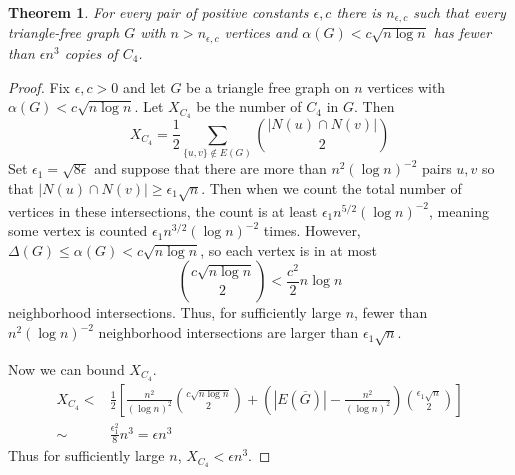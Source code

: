 \documentclass[12 pt]{article}
\newtheorem{theorem}{Theorem}
\begin{document}
\begin{theorem}
For every pair of positive constants $\epsilon, c$ there is $n_{\epsilon, c}$ such that every triangle-free graph $G$ with $n > n_{\epsilon, c}$ vertices and $\alpha(G) < c\sqrt{n\log n}$ has fewer than $\epsilon n^3$ copies of $C_4$.
\end{theorem}

\begin{proof}
	Fix $\epsilon, c> 0$ and let $G$ be a triangle free graph on $n$ vertices with $\alpha(G) < c\sqrt{n\log n}$.  Let $X_{C_4}$ be the number of $C_4$ in $G$.  Then
\[X_{C_4} = \frac{1}{2}\sum_{\{u,v\}\notin E(G)} {|N(u) \cap N(v)| \choose 2}\]
Set $\epsilon_1 = \sqrt{8\epsilon}$ and suppose that there are more than $n^2(\log n)^{-2}$ pairs $u,v$ so that $|N(u)\cap N(v)| \geq \epsilon_1\sqrt{n}$. Then when we count the total number of vertices in these intersections, the count is at least $\epsilon_1n^{5/2}(\log n)^{-2}$, meaning some vertex is counted $\epsilon_1n^{3/2}(\log n)^{-2}$ times.  However, $\Delta(G) \leq \alpha(G) < c\sqrt{n\log n}$, so each vertex is in at most \[{c\sqrt{n\log n}\choose 2 } < \frac{c^2}{2}n\log n\] neighborhood intersections.  Thus, for sufficiently large $n$,  fewer than $n^2(\log n)^{-2}$ neighborhood intersections are larger than $\epsilon_1\sqrt{n}$.     

Now we can bound $X_{C_4}$.
\begin{eqnarray}X_{C_4} <& \frac{1}{2}\left[\frac{n^2}{(\log n)^2}{c\sqrt{n\log n}\choose 2}+ \left(|E(\overline{G})|- \frac{n^2}{(\log n)^2}\right){\epsilon_1\sqrt{n}\choose 2}\right]\\
\sim& \frac{\epsilon_1^2}{8}n^3 = \epsilon n^3
\end{eqnarray}
Thus for sufficiently large $n$, $X_{C_4} < \epsilon n^3$.
\end{proof}
\end{document}
